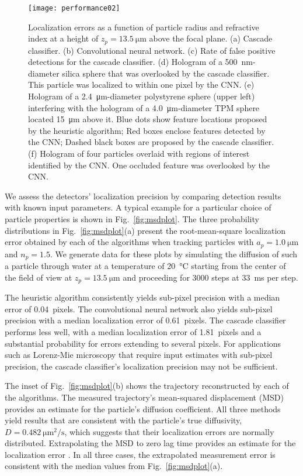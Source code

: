 \documentclass[10pt,letterpaper]{article}
\begin{document}
\begin{figure}
  \centering
  \texttt{[image: performance02]}
  \caption{Localization errors as a function of particle
  radius and refractive index at a height of $z_p = \SI{13.5}{\um}$
  above the focal plane. (a) Cascade classifier. (b) Convolutional
  neural network. (c) Rate of false positive detections for the 
  cascade classifier. (d) Hologram of a \SI{500}{\nm}-diameter silica sphere that was
  overlooked by the cascade classifier.  This particle was localized
  to within one pixel by the CNN.
  (e) Hologram of a \SI{2.4}{\um}-diameter
  polystyrene sphere (upper left) interfering with the hologram of
  a \SI{4.0}{\um}-diameter TPM sphere located \SI{15}{\um} above it.
  Blue dots show feature locations proposed by the heuristic
  algorithm; Red boxes enclose features detected by the CNN; 
  Dashed black boxes are proposed by the cascade classifier.
  (f) Hologram of four particles
  overlaid with regions of interest identified by the CNN.  One
  occluded feature was overlooked by the CNN.
  }
  \label{fig:figure3}
\end{figure}

We assess the detectors' localization precision by 
comparing detection results with known 
input parameters.
A typical example for a particular choice of particle
properties is shown in Fig.~\ref{fig:msdplot}.
The three probability distributions 
in Fig.~\ref{fig:msdplot}(a) present
the root-mean-square localization error
obtained by each of the algorithms when tracking
particles with
$a_p =\SI{1.0}{\um}$ and $n_p = \num{1.5}$.
We generate data for these plots by simulating the
diffusion of such a particle through water
at a temperature of \SI{20}{\celsius} starting from 
the center of the field of view at $z_p=\SI{13.5}{\um}$
and proceeding for \num{3000} steps at \SI{33}{\ms} per step.

The heuristic algorithm consistently 
yields sub-pixel precision with a median error of 
\SI{0.04}{pixels}. 
The convolutional neural network also yields sub-pixel
precision with a median localization error of \SI{0.61}{pixels}.
The cascade classifier performs less well,
with a median localization error of \SI{1.81}{pixels} and
a substantial probability
for errors extending to several pixels.
For applications such as Lorenz-Mie microscopy
that require input estimates with sub-pixel precision,
the cascade classifier's localization precision may not
be sufficient.

The inset of Fig.~\ref{fig:msdplot}(b) shows the trajectory
reconstructed by each of the algorithms.
The measured trajectory's mean-squared displacement (MSD)
provides an estimate for the particle's
diffusion coefficient.
All three methods yield results that are consistent with
the particle's true diffusivity,
$D = \SI{0.482}{\um^2 \per \second}$,
which suggests that
their localization errors are normally distributed.
Extrapolating the MSD to zero lag time 
provides an estimate for the localization error \cite{crocker96,michalet12}.
In all three cases, the extrapolated measurement error
is consistent with the median values from Fig.~\ref{fig:msdplot}(a). 
\end{document}
